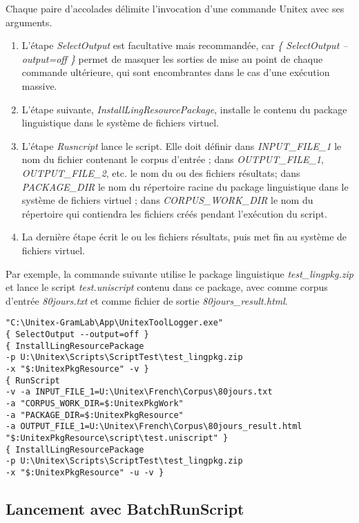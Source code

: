 \noindent Chaque paire d'accolades délimite l'invocation d'une commande Unitex avec ses arguments.

\begin{enumerate}
\item L'étape \emph{SelectOutput} est facultative mais recommandée, car \emph{\{ SelectOutput --output=off \}} permet de masquer les sorties de mise au point de chaque commande ultérieure, qui sont encombrantes dans le cas d'une exécution massive.
\item L'étape suivante, \emph{InstallLingResourcePackage}, installe le contenu du package linguistique dans le système de fichiers virtuel.
\item L'étape \emph{Rusncript} lance le script. Elle doit définir dans \emph{INPUT\_FILE\_1} le nom du fichier contenant le corpus d'entrée ; dans \emph{OUTPUT\_FILE\_1}, \emph{OUTPUT\_FILE\_2}, etc. le nom du ou des fichiers résultats; dans \emph{PACKAGE\_DIR} le nom du répertoire racine du package linguistique dans le système de fichiers virtuel ; dans \emph{CORPUS\_WORK\_DIR} le nom du répertoire qui contiendra les fichiers créés pendant l'exécution du script.
\item La dernière étape écrit le ou les fichiers résultats, puis met fin au système de fichiers virtuel.
\end{enumerate}

\noindent Par exemple, la commande suivante utilise le package linguistique \emph{test\_lingpkg.zip} et lance le script \emph{test.uniscript} contenu dans ce package, avec comme corpus d'entrée \emph{80jours.txt} et comme fichier de sortie \emph{80jours\_result.html}.

\begin{verbatim}
"C:\Unitex-GramLab\App\UnitexToolLogger.exe" 
{ SelectOutput --output=off } 
{ InstallLingResourcePackage 
-p U:\Unitex\Scripts\ScriptTest\test_lingpkg.zip 
-x "$:UnitexPkgResource" -v } 
{ RunScript 
-v -a INPUT_FILE_1=U:\Unitex\French\Corpus\80jours.txt 
-a "CORPUS_WORK_DIR=$:UnitexPkgWork" 
-a "PACKAGE_DIR=$:UnitexPkgResource" 
-a OUTPUT_FILE_1=U:\Unitex\French\Corpus\80jours_result.html 
"$:UnitexPkgResource\script\test.uniscript" } 
{ InstallLingResourcePackage 
-p U:\Unitex\Scripts\ScriptTest\test_lingpkg.zip 
-x "$:UnitexPkgResource" -u -v }
\end{verbatim}

\subsection{Lancement avec BatchRunScript}

